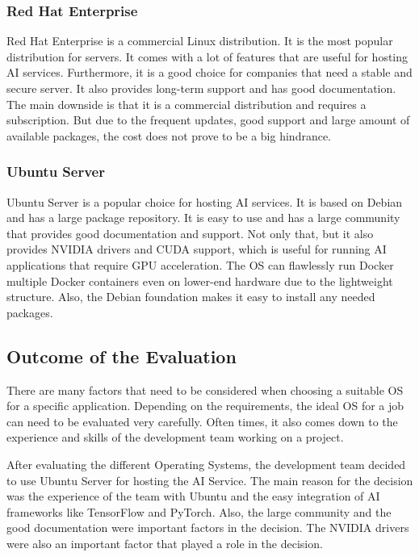 \cite{LinuxForServerDebian}

\subsubsection{Red Hat Enterprise}

Red Hat Enterprise is a commercial Linux distribution. It is the most popular distribution for servers. It comes with a lot of features that are useful for hosting AI services. Furthermore, it is a good choice for companies that need a stable and secure server. It also provides long-term support and has good documentation.
The main downside is that it is a commercial distribution and requires a subscription. But due to the frequent updates, good support and large amount of available packages, the cost does not prove to be a big hindrance.

\cite{LinuxForServerRedhat}

\subsubsection{Ubuntu Server}

Ubuntu Server is a popular choice for hosting AI services. It is based on Debian and has a large package repository. It is easy to use and has a large community that provides good documentation and support. Not only that, but it also provides NVIDIA drivers and CUDA support, which is useful for running AI applications that require GPU acceleration.
The OS can flawlessly run Docker multiple Docker containers even on lower-end hardware due to the lightweight structure. Also, the Debian foundation makes it easy to install any needed packages. 


\cite{lacroix2022mastering}

\subsection {Outcome of the Evaluation}

There are many factors that need to be considered when choosing a suitable OS for a specific application. Depending on the requirements, the ideal OS for a job can need to be evaluated very carefully. 
Often times, it also comes down to the experience and skills of the development team working on a project. 

After evaluating the different Operating Systems, the development team decided to use Ubuntu Server for hosting the AI Service.
The main reason for the decision was the experience of the team with Ubuntu and the easy integration of AI frameworks like TensorFlow and PyTorch.
Also, the large community and the good documentation were important factors in the decision. The NVIDIA drivers were also an important factor that played a role in the decision.




